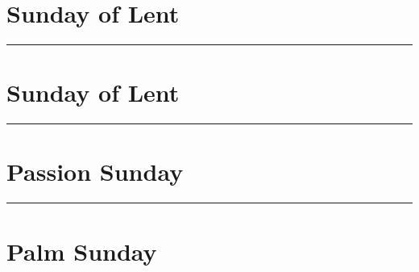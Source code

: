 {{{\bigskip
\benedicamusdomino{}
}

{
\section{ Sunday of Lent}
\label{lent3}
\printcommonvespers[1]

\def\commemorations{If today is March 18 or 19, First Vespers of St Joseph is commemorated as on page \pageref{stjoseph-commem}.  If today is March 24 or 25, First Vespers of the Annunciation is commemorated as follows.}
\printcommemnote{}
}

\medskip
\hrule
{
\label{annunciation-commem}
\def\begincollectcols{\begin{parcolumns}[rulebetween,colwidths={1=0.43\linewidth}]{2}}


\bigskip

\benedicamusdominolentoreaster{}
}

\def\commemorations{If today is March 18 or 19, First Vespers of St Joseph is commemorated as on page \pageref{stjoseph-commem}.  If today is March 24 or 25, First Vespers of the Annunciation is commemorated as on page \pageref{annunciation-commem}.}
{
\section{ Sunday of Lent}
\label{lent4}
\def\liturgicalcolor{Violet or Rose}
\printcommonvespers[1]

\printcommemnote{}
}

\medskip
\hrule
{
\let\printhymnnote=\undefined
\section{Passion Sunday}
\label{lent5}\label{passionsunday}
\printcommonvespers[1]
\def\hymnlabel{hymn-vexillaregis}
\def\prehymn{\needspace{20\baselineskip}\printnote{All kneel for the sixth verse of the following hymn.}}
\def\vrlabel{vr-eripeme}
\def\hymninput{\gabcfolder/inc-hymn-VexillaRegis}
\def\premagnificat{\pagebreak}
\def\precollect{\vspace{-1.5\baselineskip}}

\printcommemnote{}
}

\medskip
\hrule
{
\section{Palm Sunday}
\label{lent6}\label{palmsunday}
\printcommonvespers[1]
\renewcommand{\printhymnnote}{
	\noindent\printnote{Hymn.~\emph{Vexílla Regis}, page \pageref{hymn-vexillaregis}.
	\Vbar~\emph{Eripe me, Dómine}, page \pageref{vr-eripeme}.}
}

\bigskip
\benedicamusdomino{}
}

}
}